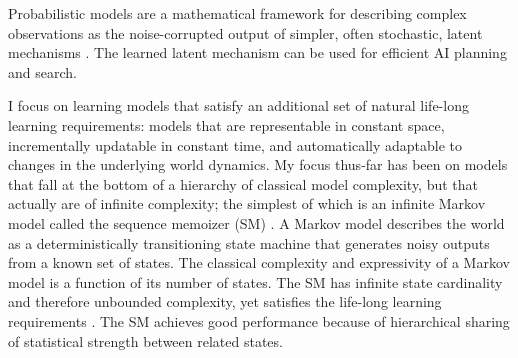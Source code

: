 \documentclass[12pt]{article}
\begin{document}
\vspace{.1cm}
\vspace{.1cm}

\noindent Probabilistic models are a mathematical framework for describing complex observations as the noise-corrupted output of simpler, often stochastic, latent mechanisms \cite{Bishop2006}.  The learned latent mechanism can be used for efficient AI planning and search.

I focus on learning models that satisfy an additional set of natural life-long learning requirements: models that are representable in constant space, incrementally updatable in constant time, and automatically adaptable to changes in the underlying world dynamics.  My focus thus-far has been on models that 
 fall at the bottom of a hierarchy of classical model complexity, but that actually are of infinite complexity; the simplest of which is an infinite Markov model called the sequence memoizer (SM) \cite{Wood2009}.  A Markov model describes the world as a deterministically transitioning state machine that generates noisy outputs from a known set of states.  The classical complexity and expressivity of a Markov model is a function of its number of states.  The SM has infinite state cardinality and therefore unbounded complexity, yet satisfies the life-long learning requirements \cite{Gasthaus2010,Bartlett2010,Bartlett2011}.  The SM achieves good performance because of hierarchical sharing of statistical strength between related states.
\end{document}
